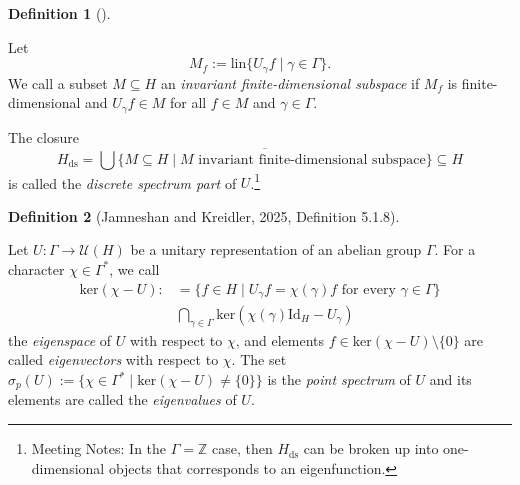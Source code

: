 \documentclass[
  british,
]{article}
\theoremstyle{definition}
\theoremstyle{definition}
\newtheorem{definition}{Definition}[section]
\theoremstyle{plain}
\theoremstyle{remark}
\newcommand{\AmenableGroup}{{\Gamma}}
\newcommand{\AmenableGroupElement}{{\gamma}}
\newcommand{\Dual}[1]{{#1}^{*}}
\newcommand{\Group}{{\Gamma}}
\newcommand{\GroupElement}{{\gamma}}
\newcommand{\HilbertSpace}{{H}}
\begin{document}
\begin{definition}[]\protect\hypertarget{def-DiscreteSpectrum}{}\label{def-DiscreteSpectrum}

Let
\[M_f:=\text{lin}\{U_\AmenableGroupElement f\mid\AmenableGroupElement\in\AmenableGroup \}. \]
We call a subset \(M\subseteq \HilbertSpace\) an \emph{invariant
finite-dimensional subspace} if \(M_f\) is finite-dimensional and
\(U_\AmenableGroupElement f\in M\) for all \(f\in M\) and
\(\AmenableGroupElement\in\AmenableGroup\).

The closure
\[\HilbertSpace_\text{ds}=\overline{\bigcup\{M\subseteq \HilbertSpace\mid M\text{ invariant finite-dimensional subspace} \}}\subseteq \HilbertSpace \]
is called the \emph{discrete spectrum part} of \(U\).\footnote{Meeting
  Notes: In the \(\AmenableGroup=\mathbb{Z}\) case, then
  \(\HilbertSpace_\text{ds}\) can be broken up into one-dimensional
  objects that corresponds to an eigenfunction.}

\end{definition}

\begin{definition}[{Jamneshan and Kreidler, 2025, Definition
5.1.8}]\protect\hypertarget{def-EigenSpace}{}\label{def-EigenSpace}

Let \(U:\Group\rightarrow\mathscr{U}(\HilbertSpace)\) be a unitary
representation of an abelian group \(\Group\). For a character
\(\chi\in\Dual{\Group}\), we call \begin{align*}
  \text{ker}(\chi-U):&=\{f\in\HilbertSpace\mid U_\GroupElement f=\chi(\GroupElement)f\text{ for every }\GroupElement\in\Group\}
  \\&\bigcap_{\GroupElement\in\Group}\text{ker}(\chi(\GroupElement)\text{Id}_\HilbertSpace-U_\GroupElement)
\end{align*} the \emph{eigenspace} of \(U\) with respect to \(\chi\),
and elements \(f\in\text{ker}(\chi-U)\setminus\{0\}\) are called
\emph{eigenvectors} with respect to \(\chi\). The set
\(\sigma_p(U):=\{\chi\in\Dual{\Group}\mid\text{ker}(\chi-U)\neq\{0\}\}\)
is the \emph{point spectrum} of \(U\) and its elements are called the
\emph{eigenvalues} of \(U\).

\end{definition}
\end{document}

